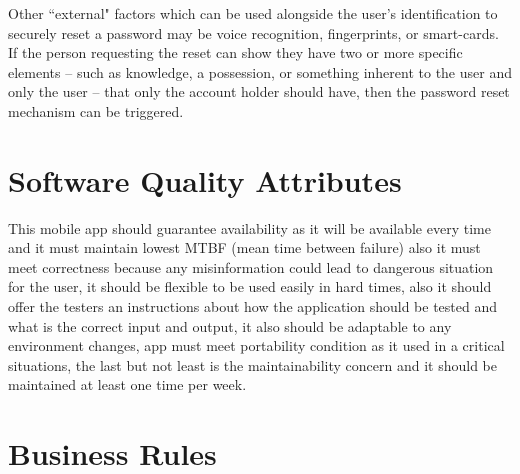 \documentclass{scrreprt}
\begin{document}
Other ``external" factors which can be used alongside the user’s identification to securely reset a password may be voice recognition, fingerprints, or smart-cards. If the person requesting the reset can show they have two or more specific elements – such as knowledge, a possession, or something inherent to the user and only the user – that only the account holder should have, then the password reset mechanism can be triggered.

\section{Software Quality Attributes}
This mobile app should guarantee availability as it will be available every time and it must maintain lowest MTBF (mean time between failure) also it must meet correctness because any misinformation could lead to dangerous situation for the user, it should be flexible to be used easily in hard times, also it should offer the testers an instructions about how the application should be tested and what is the correct input and output, it also should be adaptable to any environment changes, app must meet portability condition as it used in a critical situations, the last but not least is the maintainability concern and it should be maintained at least one time per week.


\section{Business Rules}


\end{document}
